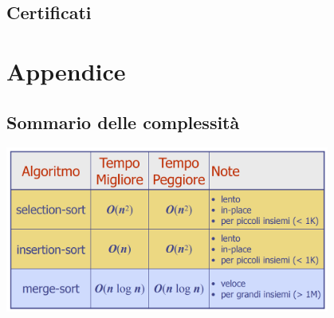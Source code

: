 \documentclass{article}
\begin{document}
\subsection{Certificati}


\pagebreak

\section{Appendice}
\subsection*{Sommario delle complessità}
\begin{center}
  \includegraphics[width=0.8\textwidth]{costo_algo}
\end{center}
\end{document}
